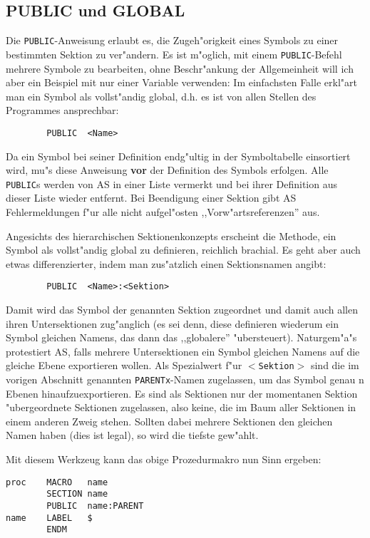 \documentclass[12pt,a4paper,twoside]{report}
\newcommand{\bb}[1]{{\bf #1}}
\newcommand{\tty}[1]{{\tt #1}}
\begin{document}
\subsection{PUBLIC und GLOBAL}

Die \tty{PUBLIC}-Anweisung erlaubt es, die Zugeh"origkeit eines Symbols
zu einer bestimmten Sektion zu ver"andern.  Es ist m"oglich, mit einem
\tty{PUBLIC}-Befehl mehrere Symbole zu bearbeiten, ohne Beschr"ankung
der Allgemeinheit will ich aber ein Beispiel mit nur einer Variable verwenden:
Im einfachsten Falle erkl"art man ein Symbol als vollst"andig global, d.h.
es ist von allen Stellen des Programmes ansprechbar:
\begin{verbatim}
        PUBLIC  <Name>
\end{verbatim}
Da ein Symbol bei seiner Definition endg"ultig in der Symboltabelle
einsortiert wird, mu"s diese Anweisung \bb{vor} der Definition des
Symbols erfolgen.  Alle \tty{PUBLIC}s werden von AS in einer Liste
vermerkt und bei ihrer Definition aus dieser Liste wieder entfernt.  Bei
Beendigung einer Sektion gibt AS Fehlermeldungen f"ur alle nicht
aufgel"osten ,,Vorw"artsreferenzen'' aus.
\par
Angesichts des hierarchischen Sektionenkonzepts erscheint die Methode,
ein Symbol als vollst"andig global zu definieren, reichlich brachial.
Es geht aber auch etwas differenzierter, indem man zus"atzlich einen
Sektionsnamen angibt:
\begin{verbatim}
        PUBLIC  <Name>:<Sektion>
\end{verbatim}
Damit wird das Symbol der genannten Sektion zugeordnet und damit auch
allen ihren Untersektionen zug"anglich (es sei denn, diese definieren
wiederum ein Symbol gleichen Namens, das dann das ,,globalere''
"ubersteuert).  Naturgem"a"s protestiert AS, falls mehrere Untersektionen
ein Symbol gleichen Namens auf die gleiche Ebene exportieren wollen.
Als Spezialwert f"ur \tty{$<$Sektion$>$} sind die im vorigen Abschnitt
genannten \tty{PARENTx}-Namen zugelassen, um das Symbol genau n Ebenen hinaufzuexportieren.
Es sind als Sektionen nur der momentanen Sektion "ubergeordnete Sektionen
zugelassen, also keine, die im Baum aller Sektionen in einem anderen Zweig
stehen.  Sollten dabei mehrere Sektionen den gleichen Namen haben (dies ist
legal), so wird die tiefste gew"ahlt.
\par
Mit diesem Werkzeug kann das obige Prozedurmakro nun Sinn ergeben:
\begin{verbatim}
proc    MACRO   name
        SECTION name
        PUBLIC  name:PARENT
name    LABEL   $
        ENDM
\end{verbatim}
\end{document}
